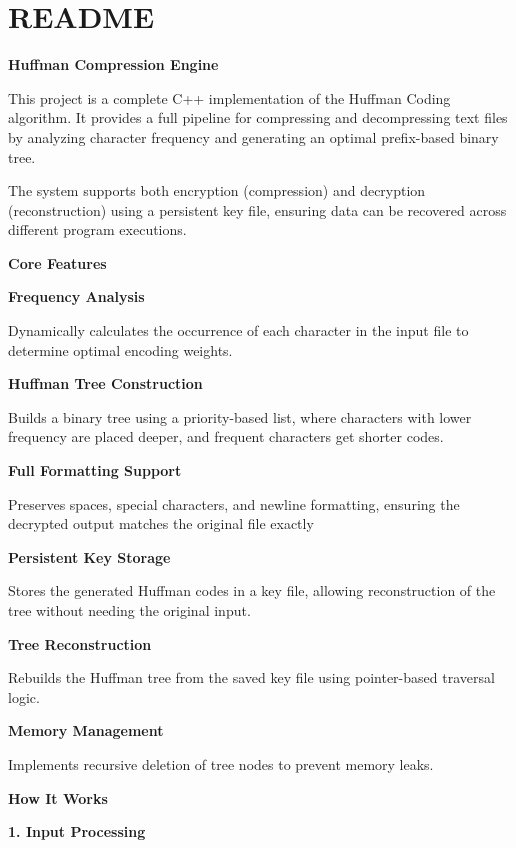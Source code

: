 \chapter{README }
\hypertarget{md__r_e_a_d_m_e}{}\label{md__r_e_a_d_m_e}
{\bfseries{Huffman Compression Engine}}

This project is a complete C++ implementation of the Huffman Coding algorithm. It provides a full pipeline for compressing and decompressing text files by analyzing character frequency and generating an optimal prefix-\/based binary tree.

The system supports both encryption (compression) and decryption (reconstruction) using a persistent key file, ensuring data can be recovered across different program executions.

{\bfseries{Core Features}}


\begin{DoxyItemize}
\item {\bfseries{Frequency Analysis}}
\item Dynamically calculates the occurrence of each character in the input file to determine optimal encoding weights.
\item {\bfseries{Huffman Tree Construction}}
\item Builds a binary tree using a priority-\/based list, where characters with lower frequency are placed deeper, and frequent characters get shorter codes.
\item {\bfseries{Full Formatting Support}}
\item Preserves spaces, special characters, and newline formatting, ensuring the decrypted output matches the original file exactly
\item {\bfseries{Persistent Key Storage}}
\item Stores the generated Huffman codes in a key file, allowing reconstruction of the tree without needing the original input.
\item {\bfseries{Tree Reconstruction}}
\item Rebuilds the Huffman tree from the saved key file using pointer-\/based traversal logic.
\item {\bfseries{Memory Management}}
\item Implements recursive deletion of tree nodes to prevent memory leaks.
\end{DoxyItemize}

{\bfseries{How It Works}}

{\bfseries{1. Input Processing}}


